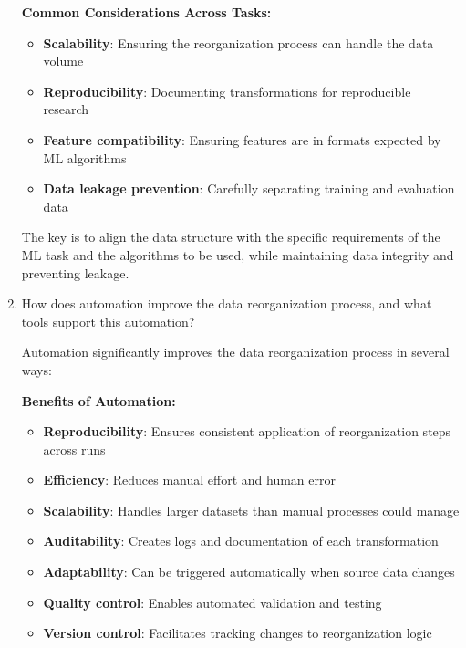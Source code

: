 \documentclass[12pt]{article}
\begin{document}
\begin{enumerate}
\begin{tcolorbox}[colback=blue!5!white,colframe=blue!75!black,title={Solution}]
    \textbf{Common Considerations Across Tasks:}
    \begin{itemize}
        \item \textbf{Scalability}: Ensuring the reorganization process can handle the data volume
        \item \textbf{Reproducibility}: Documenting transformations for reproducible research
        \item \textbf{Feature compatibility}: Ensuring features are in formats expected by ML algorithms
        \item \textbf{Data leakage prevention}: Carefully separating training and evaluation data
    \end{itemize}
    
    The key is to align the data structure with the specific requirements of the ML task and the algorithms to be used, while maintaining data integrity and preventing leakage.
    \end{tcolorbox}
    
    \item How does automation improve the data reorganization process, and what tools support this automation?
    
    \begin{tcolorbox}[colback=blue!5!white,colframe=blue!75!black,title={Solution}]
    Automation significantly improves the data reorganization process in several ways:
    
    \textbf{Benefits of Automation:}
    \begin{itemize}
        \item \textbf{Reproducibility}: Ensures consistent application of reorganization steps across runs
        \item \textbf{Efficiency}: Reduces manual effort and human error
        \item \textbf{Scalability}: Handles larger datasets than manual processes could manage
        \item \textbf{Auditability}: Creates logs and documentation of each transformation
        \item \textbf{Adaptability}: Can be triggered automatically when source data changes
        \item \textbf{Quality control}: Enables automated validation and testing
        \item \textbf{Version control}: Facilitates tracking changes to reorganization logic
    \end{itemize}
    

\end{tcolorbox}
\end{enumerate}
\end{document}
